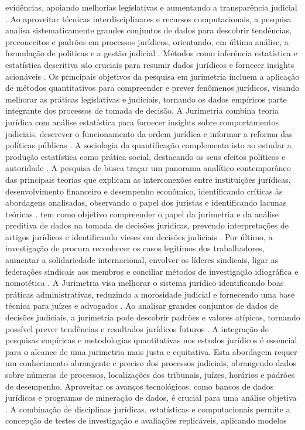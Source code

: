 \begin{agradecimentos}
evidências, apoiando melhorias legislativas e aumentando a transparência judicial \cite{massuanganhe2016, nunes2018, silva2023}. Ao aproveitar técnicas interdisciplinares e recursos computacionais, a pesquisa analisa sistematicamente grandes conjuntos de dados para descobrir tendências, preconceitos e padrões em processos jurídicos, orientando, em última análise, a formulação de políticas e a gestão judicial \cite{machado2017, de2010, ribeiro2021}. Métodos como inferência estatística e estatística descritiva são cruciais para resumir dados jurídicos e fornecer insights acionáveis \cite{massuanganhe2016, zabala2019}. Os principais objetivos da pesquisa em jurimetria incluem a aplicação de métodos quantitativos para compreender e prever fenômenos jurídicos, visando melhorar as práticas legislativas e judiciais, tornando os dados empíricos parte integrante dos processos de tomada de decisão. A Jurimetria combina teoria jurídica com análise estatística para fornecer insights sobre comportamentos judiciais, descrever o funcionamento da ordem jurídica e informar a reforma das políticas públicas \cite{nunes2018, nunes2018, nunes2018, de2010}. A sociologia da quantificação complementa isto ao estudar a produção estatística como prática social, destacando os seus efeitos políticos e autoridade \cite{paiva2021}. A pesquisa de \cite{borges2015} busca traçar um panorama analítico contemporâneo das principais teorias que explicam as interconexões entre instituições jurídicas, desenvolvimento financeiro e desempenho econômico, identificando críticas às abordagens analisadas, observando o papel dos juristas e identificando lacunas teóricas \cite {borges2015}. \cite{Silva2023} tem como objetivo compreender o papel da jurimetria e da análise preditiva de dados na tomada de decisões jurídicas, prevendo interpretações de artigos jurídicos e identificando vieses em decisões judiciais \cite{silva2023,silva2023}. Por último, a investigação de \cite{turnbull2022} procura reconhecer os casos legítimos dos trabalhadores, aumentar a solidariedade internacional, envolver os líderes sindicais, ligar as federações sindicais aos membros e conciliar métodos de investigação idiográfica e nomotética \cite{turnbull2022}. A Jurimetria visa melhorar o sistema jurídico identificando boas práticas administrativas, reduzindo a morosidade judicial e fornecendo uma base técnica para juízes e advogados \cite{silva2023role}. Ao analisar grandes conjuntos de dados de decisões judiciais, a jurimetria pode descobrir padrões e valores atípicos, tornando possível prever tendências e resultados jurídicos futuros \cite{silva2023role}. A integração de pesquisas empíricas e metodologias quantitativas nos estudos jurídicos é essencial para o alcance de uma jurimetria mais justa e equitativa. Esta abordagem requer um conhecimento abrangente e preciso dos processos judiciais, abrangendo dados sobre números de processos, localizações dos tribunais, juízes, horários e padrões de desempenho. Aproveitar os avanços tecnológicos, como bancos de dados jurídicos e programas de mineração de dados, é crucial para uma análise objetiva \cite{nunes2018}. A combinação de disciplinas jurídicas, estatísticas e computacionais permite a concepção de testes de investigação e avaliações replicáveis, aplicando modelos 
\end{agradecimentos}
